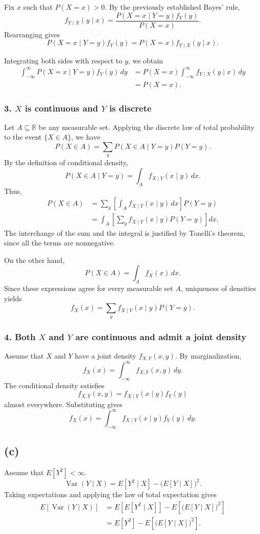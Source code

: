 \documentclass[11pt,a4paper]{article}
\begin{document}
Fix \(x\) such that \(P(X=x)>0\). By the previously established
Bayes' rule,
\[
f_{Y\mid X}(y\mid x)
=
\frac{P(X=x\mid Y=y)f_Y(y)}{P(X=x)}.
\]
Rearranging gives
\[
P(X=x\mid Y=y)f_Y(y)
=
P(X=x)f_{Y\mid X}(y\mid x).
\]

Integrating both sides with respect to \(y\), we obtain
\[
\begin{aligned}
\int_{-\infty}^{\infty}
P(X=x\mid Y=y)f_Y(y)\,dy
&=
P(X=x)\int_{-\infty}^{\infty}
f_{Y\mid X}(y\mid x)\,dy\\
&=P(X=x).
\end{aligned}
\]
\subsubsection*{3. \(X\) is continuous and \(Y\) is discrete}

Let \(A\subseteq\mathbb{R}\) be any measurable set. Applying the
discrete law of total probability to the event \(\{X\in A\}\), we have
\[
P(X\in A)
=
\sum_y P(X\in A\mid Y=y)P(Y=y).
\]
By the definition of conditional density,
\[
P(X\in A\mid Y=y)
=
\int_A f_{X\mid Y}(x\mid y)\,dx.
\]
Thus,
\[
\begin{aligned}
P(X\in A)
&=
\sum_y
\left[
\int_A f_{X\mid Y}(x\mid y)\,dx
\right]P(Y=y)\\
&=
\int_A
\left[
\sum_y f_{X\mid Y}(x\mid y)P(Y=y)
\right]dx.
\end{aligned}
\]
The interchange of the sum and the integral is justified by Tonelli's
theorem, since all the terms are nonnegative.

On the other hand,
\[
P(X\in A)=\int_A f_X(x)\,dx.
\]
Since these expressions agree for every measurable set \(A\),
uniqueness of densities yields
\[
f_X(x)
=
\sum_y f_{X\mid Y}(x\mid y)P(Y=y).
\]

\subsubsection*{4. Both \(X\) and \(Y\) are continuous and admit a joint density}

Assume that \(X\) and \(Y\) have a joint density \(f_{X,Y}(x,y)\).
By marginalization,
\[
f_X(x)
=
\int_{-\infty}^{\infty} f_{X,Y}(x,y)\,dy.
\]
The conditional density satisfies
\[
f_{X,Y}(x,y)
=
f_{X\mid Y}(x\mid y)f_Y(y)
\]
almost everywhere. Substituting gives
\[
f_X(x)
=
\int_{-\infty}^{\infty}
f_{X\mid Y}(x\mid y)f_Y(y)\,dy.
\]
\subsection*{(c)}
Assume that \(E[Y^2]<\infty\).
\[
\operatorname{Var}(Y\mid X)
=
E[Y^2\mid X]-\bigl(E[Y\mid X]\bigr)^2.
\]
Taking expectations and applying the law of total expectation gives
\[
\begin{aligned}
E[\operatorname{Var}(Y\mid X)]
&=
E[E[Y^2\mid X]]
-
E\!\left[\bigl(E[Y\mid X]\bigr)^2\right]\\
&=
E[Y^2]
-
E\!\left[\bigl(E[Y\mid X]\bigr)^2\right].
\end{aligned}
\]
\end{document}
